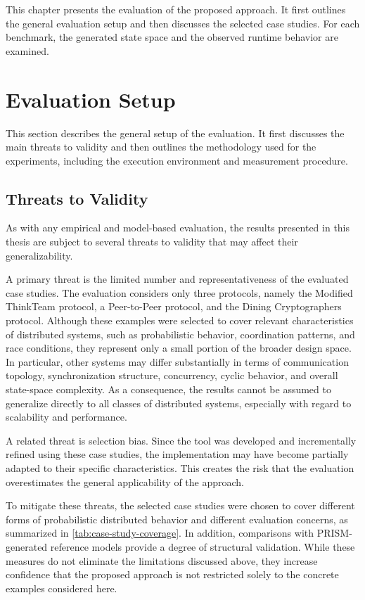 This chapter presents the evaluation of the proposed approach. It first outlines the general evaluation setup and then discusses the selected case studies. For each benchmark, the generated state space and the observed runtime behavior are examined.
\section{Evaluation Setup}
This section describes the general setup of the evaluation. It first discusses the main threats to validity and then outlines the methodology used for the experiments, including the execution environment and measurement procedure.
\subsection{Threats to Validity}
As with any empirical and model-based evaluation, the results presented in this thesis are subject to several threats to validity that may affect their generalizability.

A primary threat is the limited number and representativeness of the evaluated case studies. The evaluation considers only three protocols, namely the Modified ThinkTeam protocol, a Peer-to-Peer protocol, and the Dining Cryptographers protocol. Although these examples were selected to cover relevant characteristics of distributed systems, such as probabilistic behavior, coordination patterns, and race conditions, they represent only a small portion of the broader design space. In particular, other systems may differ substantially in terms of communication topology, synchronization structure, concurrency, cyclic behavior, and overall state-space complexity. As a consequence, the results cannot be assumed to generalize directly to all classes of distributed systems, especially with regard to scalability and performance.

A related threat is selection bias. Since the tool was developed and incrementally refined using these case studies, the implementation may have become partially adapted to their specific characteristics. This creates the risk that the evaluation overestimates the general applicability of the approach.

To mitigate these threats, the selected case studies were chosen to cover different forms of probabilistic distributed behavior and different evaluation concerns, as summarized in \cref{tab:case-study-coverage}. In addition, comparisons with PRISM-generated reference models provide a degree of structural validation. While these measures do not eliminate the limitations discussed above, they increase confidence that the proposed approach is not restricted solely to the concrete examples considered here.

